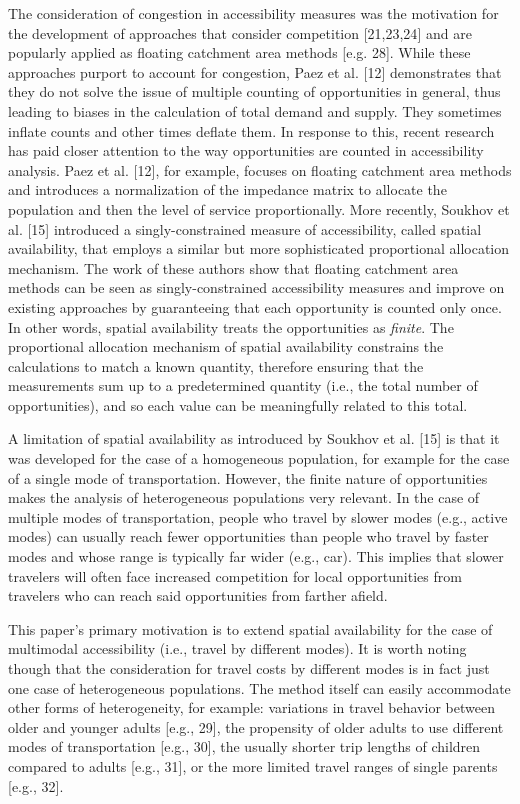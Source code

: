 \documentclass[10pt,letterpaper]{article}
\begin{document}
The consideration of congestion in accessibility measures was the
motivation for the development of approaches that consider competition
{[}21,23,24{]} and are popularly applied as floating catchment area
methods {[}e.g. 28{]}. While these approaches purport to account for
congestion, Paez et al. {[}12{]} demonstrates that they do not solve the
issue of multiple counting of opportunities in general, thus leading to
biases in the calculation of total demand and supply. They sometimes
inflate counts and other times deflate them. In response to this, recent
research has paid closer attention to the way opportunities are counted
in accessibility analysis. Paez et al. {[}12{]}, for example, focuses on
floating catchment area methods and introduces a normalization of the
impedance matrix to allocate the population and then the level of
service proportionally. More recently, Soukhov et al. {[}15{]}
introduced a singly-constrained measure of accessibility, called spatial
availability, that employs a similar but more sophisticated proportional
allocation mechanism. The work of these authors show that floating
catchment area methods can be seen as singly-constrained accessibility
measures and improve on existing approaches by guaranteeing that each
opportunity is counted only once. In other words, spatial availability
treats the opportunities as \emph{finite}. The proportional allocation
mechanism of spatial availability constrains the calculations to match a
known quantity, therefore ensuring that the measurements sum up to a
predetermined quantity (i.e., the total number of opportunities), and so
each value can be meaningfully related to this total.

A limitation of spatial availability as introduced by Soukhov et al.
{[}15{]} is that it was developed for the case of a homogeneous
population, for example for the case of a single mode of transportation.
However, the finite nature of opportunities makes the analysis of
heterogeneous populations very relevant. In the case of multiple modes
of transportation, people who travel by slower modes (e.g., active
modes) can usually reach fewer opportunities than people who travel by
faster modes and whose range is typically far wider (e.g., car). This
implies that slower travelers will often face increased competition for
local opportunities from travelers who can reach said opportunities from
farther afield.

This paper's primary motivation is to extend spatial availability for
the case of multimodal accessibility (i.e., travel by different modes).
It is worth noting though that the consideration for travel costs by
different modes is in fact just one case of heterogeneous populations.
The method itself can easily accommodate other forms of heterogeneity,
for example: variations in travel behavior between older and younger
adults {[}e.g., 29{]}, the propensity of older adults to use different
modes of transportation {[}e.g., 30{]}, the usually shorter trip lengths
of children compared to adults {[}e.g., 31{]}, or the more limited
travel ranges of single parents {[}e.g., 32{]}.
\end{document}
